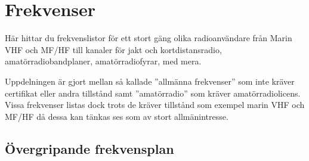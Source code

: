 
\chapter{Frekvenser}

Här hittar du frekvenslistor för ett stort gäng olika radioanvändare från
Marin VHF och MF/HF till kanaler för jakt och kortdistansradio,
amatörradiobandplaner, amatörradiofyrar, med mera.

Uppdelningen är gjort mellan så kallade ''allmänna frekvenser'' som inte
kräver certifikat eller andra tillstånd samt ''amatörradio'' som kräver
amatörradiolicens. Vissa frekvenser listas dock trots de kräver tillstånd som
exempel marin VHF och MF/HF då dessa kan tänkas ses som av stort
allmänintresse.

\vfill \minitoc

\clearpage

\section{Övergripande frekvensplan}

